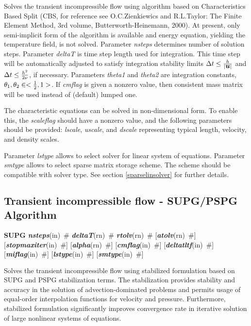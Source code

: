 \documentclass[draft]{article}
\newcommand{\mbf}[1]{\mbox{\boldmath$#1$}}
\newcommand{\param}[1]{{\em #1}}
\newcommand{\keywordnotype}[1]{\mbox{{\it{\bf{#1}}}}}
\newcommand{\keyword}[2]{\mbox{{\keywordnotype{#1}\tiny (#2)}}}
\newcommand{\entKeywordInst}[1]{\mbox{{\bf{{#1}}}}}
\newcommand{\field}[2]{\mbox{\keyword{#1}{#2}~\#}}
\newcommand{\optField}[2]{\mbox{[\field{#1}{#2}]}}
\begin{document}
Solves the transient incompressible flow using algorithm based on
Characteristics Based Split (CBS, for reference see O.C.Zienkiewics
and R.L.Taylor: The Finite Element Method, 3rd volume,
Butterworth-Heinemann, 2000). At present, only semi-implicit form
of the algorithm is available and energy equation, yielding the
temperature field, is not solved. 
Parameter \param{nsteps} determines number of solution
steps. Parameter \param{deltaT} is time step length used for
integration. This time step will be automatically adjusted to satisfy
integration stability limits $\Delta t \le {h\over{\vert
  \mbf{u}\vert}}$ and $\Delta t \le {{h^2}\over{2\nu}}$, if necessary. Parameters \param{theta1}
and \param{theta2} are integration constants, $\theta_1, \theta_2 \in <{1\over 2}, 1>$. If \param{cmflag} is given a nonzero value, then
consistent mass matrix will be used instead of (default) lumped one.

The characteristic equations can be solved in non-dimensional form. To
enable this, the \param{scaleflag} should have a nonzero value,
and the following parameters should be provided: \param{lscale},
\param{uscale}, and \param{dscale} representing typical length,
velocity, and density scales. 

Parameter \param{lstype} allows to select solver for linear system of
equations. Parameter \param{smtype} allows to select sparse matrix storage
scheme. The scheme should be compatible with solver type. See section
\ref{sparselinsolver} for further details.

\subsection{Transient incompressible flow - SUPG/PSPG Algorithm}
\label{supgIncomp}
\entKeywordInst{SUPG} \field{nsteps}{in} 
\field{deltaT}{rn} \field{rtolv}{rn} \optField{atolv}{rn}
\optField{stopmaxiter}{in}\newline
\optField{alpha}{rn} \optField{cmflag}{in} \optField{deltatltf}{in}
\optField{miflag}{in} \newline
[\field{scaleflag}{in} \field{lscale}{in}
  \field{uscale}{in}\field{dscale}{in}]\newline \optField{lstype}{in} \optField{smtype}{in}

Solves the transient incompressible flow using stabilized formulation
based on SUPG and PSPG
stabilization terms. The stabilization provides
stability and accuracy in the solution of
advection-dominated problems and permits usage of equal-order
interpolation functions for velocity and pressure. Furthermore,
stabilized formulation significantly improves convergence rate in
iterative solution of large nonlinear systems of equations.
\end{document}
